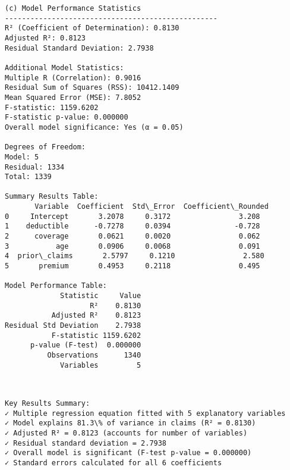 \documentclass[8pt, twocolumn]{extarticle}
\begin{document}
    \begin{Verbatim}[commandchars=\\\{\}]
(c) Model Performance Statistics
--------------------------------------------------
R² (Coefficient of Determination): 0.8130
Adjusted R²: 0.8123
Residual Standard Deviation: 2.7938

Additional Model Statistics:
Multiple R (Correlation): 0.9016
Residual Sum of Squares (RSS): 10412.1409
Mean Squared Error (MSE): 7.8052
F-statistic: 1159.6202
F-statistic p-value: 0.000000
Overall model significance: Yes (α = 0.05)

Degrees of Freedom:
Model: 5
Residual: 1334
Total: 1339

Summary Results Table:
       Variable  Coefficient  Std\_Error  Coefficient\_Rounded
0     Intercept       3.2078     0.3172                3.208
1    deductible      -0.7278     0.0394               -0.728
2      coverage       0.0621     0.0020                0.062
3           age       0.0906     0.0068                0.091
4  prior\_claims       2.5797     0.1210                2.580
5       premium       0.4953     0.2118                0.495

Model Performance Table:
             Statistic     Value
                    R²    0.8130
           Adjusted R²    0.8123
Residual Std Deviation    2.7938
           F-statistic 1159.6202
      p-value (F-test)  0.000000
          Observations      1340
             Variables         5
    \end{Verbatim}
    \begin{center}
    \end{center}
    { \hspace*{\fill} \\}
    \begin{Verbatim}[commandchars=\\\{\}]
Key Results Summary:
✓ Multiple regression equation fitted with 5 explanatory variables
✓ Model explains 81.3\% of variance in claims (R² = 0.8130)
✓ Adjusted R² = 0.8123 (accounts for number of variables)
✓ Residual standard deviation = 2.7938
✓ Overall model is significant (F-test p-value = 0.000000)
✓ Standard errors calculated for all 6 coefficients
    \end{Verbatim}
\end{document}
